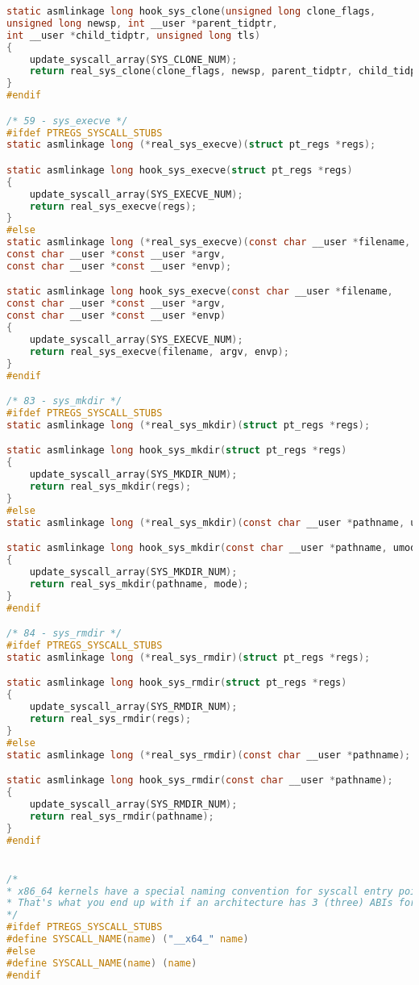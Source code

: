 \begin{lstlisting}[label=lst:log, caption=Листинг файла hooks.c, language=c]
static asmlinkage long hook_sys_clone(unsigned long clone_flags,
unsigned long newsp, int __user *parent_tidptr,
int __user *child_tidptr, unsigned long tls)
{
	update_syscall_array(SYS_CLONE_NUM);
	return real_sys_clone(clone_flags, newsp, parent_tidptr, child_tidptr, tls);
}
#endif

/* 59 - sys_execve */
#ifdef PTREGS_SYSCALL_STUBS
static asmlinkage long (*real_sys_execve)(struct pt_regs *regs);

static asmlinkage long hook_sys_execve(struct pt_regs *regs)
{
	update_syscall_array(SYS_EXECVE_NUM);
	return real_sys_execve(regs);
}
#else
static asmlinkage long (*real_sys_execve)(const char __user *filename,
const char __user *const __user *argv,
const char __user *const __user *envp);

static asmlinkage long hook_sys_execve(const char __user *filename,
const char __user *const __user *argv,
const char __user *const __user *envp)
{
	update_syscall_array(SYS_EXECVE_NUM);
	return real_sys_execve(filename, argv, envp);
}
#endif

/* 83 - sys_mkdir */
#ifdef PTREGS_SYSCALL_STUBS
static asmlinkage long (*real_sys_mkdir)(struct pt_regs *regs);

static asmlinkage long hook_sys_mkdir(struct pt_regs *regs)
{
	update_syscall_array(SYS_MKDIR_NUM);
	return real_sys_mkdir(regs);
}
#else
static asmlinkage long (*real_sys_mkdir)(const char __user *pathname, umode_t mode);

static asmlinkage long hook_sys_mkdir(const char __user *pathname, umode_t mode);
{
	update_syscall_array(SYS_MKDIR_NUM);
	return real_sys_mkdir(pathname, mode);
}
#endif

/* 84 - sys_rmdir */
#ifdef PTREGS_SYSCALL_STUBS
static asmlinkage long (*real_sys_rmdir)(struct pt_regs *regs);

static asmlinkage long hook_sys_rmdir(struct pt_regs *regs)
{
	update_syscall_array(SYS_RMDIR_NUM);
	return real_sys_rmdir(regs);
}
#else
static asmlinkage long (*real_sys_rmdir)(const char __user *pathname);

static asmlinkage long hook_sys_rmdir(const char __user *pathname);
{
	update_syscall_array(SYS_RMDIR_NUM);
	return real_sys_rmdir(pathname);
}
#endif


/*
* x86_64 kernels have a special naming convention for syscall entry points in newer kernels.
* That's what you end up with if an architecture has 3 (three) ABIs for system calls.
*/
#ifdef PTREGS_SYSCALL_STUBS
#define SYSCALL_NAME(name) ("__x64_" name)
#else
#define SYSCALL_NAME(name) (name)
#endif


\end{lstlisting}
